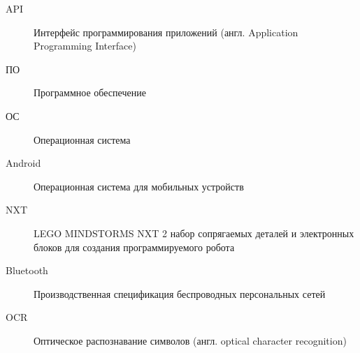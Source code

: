 \Abbreviations %
\begin{description}
\item[API] Интерфейс программирования приложений (англ. Application Programming Interface)
\item[ПО] Программное обеспечение
\item[ОС] Операционная система
\item[Android]  Операционная система для мобильных устройств
\item[NXT] LEGO MINDSTORMS NXT 2 набор сопрягаемых деталей и электронных блоков для создания программируемого робота
\item[Bluetooth] Производственная спецификация беспроводных персональных сетей
\item[OCR] Оптическое распознавание символов (англ. optical character recognition)
\end{description}

